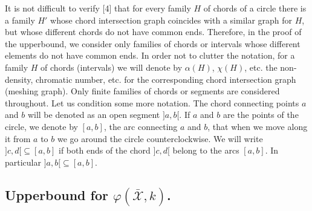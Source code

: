 \documentclass{article}
\theoremstyle{definition}
\begin{document}
    It is not difficult 
    to verify [4] that for 
    every family $H$ of chords of 
    a circle there is a family $H'$ 
    whose chord intersection graph 
    coincides with a similar graph 
    for $H$, but whose different 
    chords do not have common ends. 
    Therefore, in the proof 
    of the upperbound, we consider 
    only families of chords or intervals 
    whose different elements 
    do not have common ends.
    In order not to clutter the notation, 
    for a family $H$ of chords (intervals)
    we will denote by $\alpha\left(H\right)$, 
    $\chi\left(H\right)$, etc. 
    the non-density, chromatic number, etc. 
    for the corresponding chord 
    intersection graph (meshing graph). 
    Only finite families of 
    chords or segments are 
    considered throughout. 
    Let us condition some more notation. 
    The chord connecting points $a$ and $b$ 
    will be denoted as 
    an open segment $]a, b[$. 
    If $a$ and $b$ are 
    the points of the circle, 
    we denote by $[a, b]$, the arc connecting $a$ and $b$, 
    that when we move along it from $a$ to $b$ 
    we go around the circle counterclockwise. 
    We will write $]c, d[ \subseteq [a, b]$ 
    if both ends of the chord $]c, d[$ 
    belong to the arcs $[a, b]$. 
    In particular $]a, b[ \subseteq [a, b]$.

    \subsection{Upperbound for $\varphi\left(\bar{\mathcal{X}}, k\right)$.}
\end{document}

